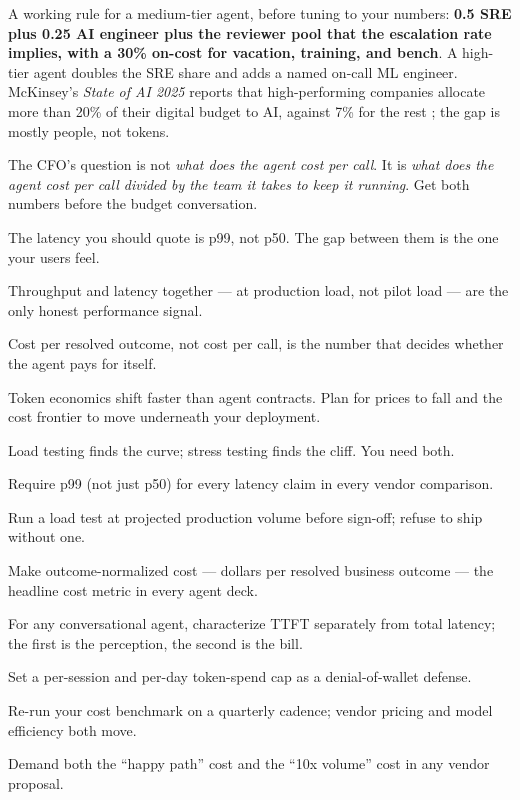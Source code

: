 A working rule for a medium-tier agent, before tuning to your numbers: \textbf{0.5 SRE plus 0.25 AI engineer plus the reviewer pool that the escalation rate implies, with a 30\% on-cost for vacation, training, and bench}. A high-tier agent doubles the SRE share and adds a named on-call ML engineer. McKinsey's \textit{State of AI 2025} reports that high-performing companies allocate more than 20\% of their digital budget to AI, against 7\% for the rest \citep{mckinsey-state-of-ai-2025}; the gap is mostly people, not tokens.

The CFO's question is not \textit{what does the agent cost per call}. It is \textit{what does the agent cost per call divided by the team it takes to keep it running}. Get both numbers before the budget conversation.

\TNrule

\stoptwocol

\begin{TNkeytakeaways}
\item The latency you should quote is p99, not p50. The gap between them is the one your users feel.
\item Throughput and latency together --- at production load, not pilot load --- are the only honest performance signal.
\item Cost per resolved outcome, not cost per call, is the number that decides whether the agent pays for itself.
\item Token economics shift faster than agent contracts. Plan for prices to fall and the cost frontier to move underneath your deployment.
\item Load testing finds the curve; stress testing finds the cliff. You need both.
\end{TNkeytakeaways}

\begin{TNchecklist}
\item Require p99 (not just p50) for every latency claim in every vendor comparison.
\item Run a load test at projected production volume before sign-off; refuse to ship without one.
\item Make outcome-normalized cost --- dollars per resolved business outcome --- the headline cost metric in every agent deck.
\item For any conversational agent, characterize TTFT separately from total latency; the first is the perception, the second is the bill.
\item Set a per-session and per-day token-spend cap as a denial-of-wallet defense.
\item Re-run your cost benchmark on a quarterly cadence; vendor pricing and model efficiency both move.
\item Demand both the ``happy path'' cost and the ``10x volume'' cost in any vendor proposal.
\end{TNchecklist}



